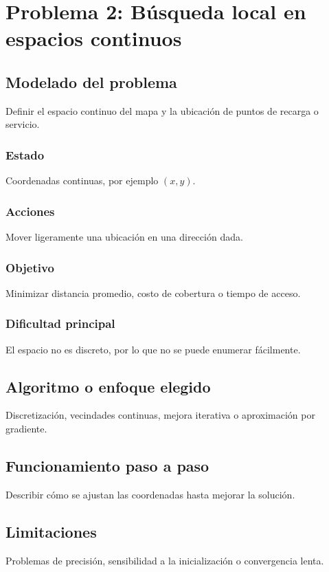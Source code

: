 \section{Problema 2: Búsqueda local en espacios continuos}

\subsection{Modelado del problema}
Definir el espacio continuo del mapa y la ubicación de puntos de recarga o servicio.

\subsubsection{Estado}
Coordenadas continuas, por ejemplo $(x,y)$.

\subsubsection{Acciones}
Mover ligeramente una ubicación en una dirección dada.

\subsubsection{Objetivo}
Minimizar distancia promedio, costo de cobertura o tiempo de acceso.

\subsubsection{Dificultad principal}
El espacio no es discreto, por lo que no se puede enumerar fácilmente.

\subsection{Algoritmo o enfoque elegido}
Discretización, vecindades continuas, mejora iterativa o aproximación por gradiente.

\subsection{Funcionamiento paso a paso}
Describir cómo se ajustan las coordenadas hasta mejorar la solución.

\subsection{Limitaciones}
Problemas de precisión, sensibilidad a la inicialización o convergencia lenta.